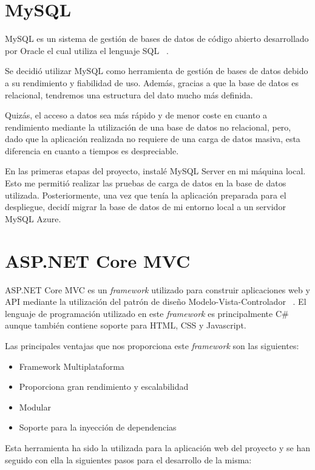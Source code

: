 \section{MySQL}
MySQL es un sistema de gestión de bases de datos de código abierto desarrollado por Oracle el cual utiliza el lenguaje SQL ~\cite{mysql:latex}.

Se decidió utilizar MySQL como herramienta de gestión de bases de datos debido a su rendimiento y fiabilidad de uso. Además, gracias a que la base de datos es relacional, tendremos una estructura del dato mucho más definida.

Quizás, el acceso a datos sea más rápido y de menor coste en cuanto a rendimiento mediante la utilización de una base de datos no relacional, pero, dado que la aplicación realizada no requiere de una carga de datos masiva, esta diferencia en cuanto a tiempos es despreciable.

En las primeras etapas del proyecto, instalé MySQL Server en mi máquina local. Esto me permitió realizar las pruebas de carga de datos en la base de datos utilizada. Posteriormente, una vez que tenía la aplicación preparada para el despliegue, decidí migrar la base de datos de mi entorno local a un servidor MySQL Azure.


\section{ASP.NET Core MVC}
ASP.NET Core MVC es un \textit{framework} utilizado para construir aplicaciones web y API mediante la utilización del patrón de diseño Modelo-Vista-Controlador ~\cite{.net:latex}. El lenguaje de programación utilizado en este \textit{framework} es principalmente C\# aunque también contiene soporte para HTML, CSS y Javascript.

Las principales ventajas que nos proporciona este \textit{framework} son las siguientes:

\begin{itemize}
    \item Framework Multiplataforma
    \item Proporciona gran rendimiento y escalabilidad
    \item Modular
    \item Soporte para la inyección de dependencias
\end{itemize}

Esta herramienta ha sido la utilizada para la aplicación web del proyecto y se han seguido con ella la siguientes pasos para el desarrollo de la misma:


